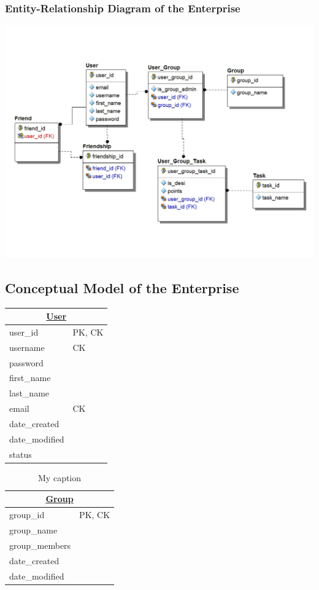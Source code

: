 \documentclass[a4paper]{article}
\begin{document}
\subsubsection{Entity-Relationship Diagram of the Enterprise}
\includegraphics[scale=0.5]{desiERD.jpg}

\subsection{Conceptual Model of the Enterprise}
\begin{table}[H]
\centering
\begin{tabular}{|l|l|}
\hline
\multicolumn{2}{|c|}{{\ul \textbf{User}}} \\ \hline
user\_id & PK, CK \\
username & CK \\
password &  \\
first\_name &  \\
last\_name &  \\
email & CK \\
date\_created &  \\
date\_modified &  \\
status & 
\end{tabular}
\end{table}


\begin{table}[H]
\centering
\caption{My caption}
\label{my-label}
\begin{tabular}{|l|l|}
\hline
\multicolumn{2}{|c|}{{\ul \textbf{Group}}} \\ \hline
group\_id & PK, CK \\
group\_name &  \\
group\_members &  \\
date\_created &  \\
date\_modified & 
\end{tabular}
\end{table}
\end{document}
